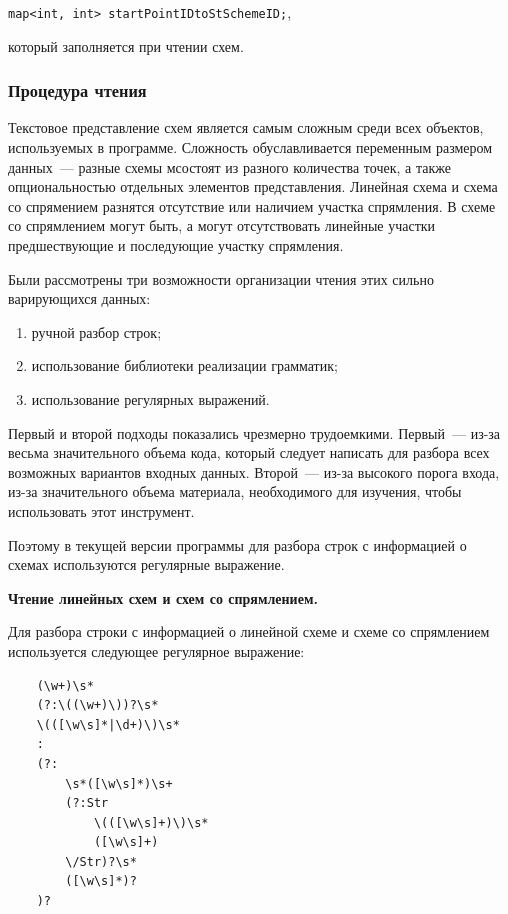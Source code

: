 \documentclass[12pt]{article}
\theoremstyle{plain}
\begin{document}
\centerline{\texttt{map<int, int> startPointIDtoStSchemeID;},}

\noindent
который заполняется при чтении схем.


\subsubsection{Процедура чтения}
\label{sec:ReadingSchemes}

Текстовое представление схем является самым сложным среди всех объектов, используемых в программе. Сложность обуславливается переменным размером данных~--- разные схемы мсостоят из разного количества точек, а также опциональностью отдельных элементов представления. Линейная схема и схема со спрямением разнятся отсутствие или наличием участка спрямления. В схеме со спрямлением могут быть, а могут отсутствовать линейные участки предшествующие и последующие участку спрямления. 

Были рассмотрены три возможности организации чтения этих сильно варирующихся данных:
\begin{enumerate}[topsep=-0.5\parsep,itemsep=-0.5\parsep]
  \item ручной разбор строк;
  \item использование библиотеки реализации грамматик;
  \item использование регулярных выражений.
\end{enumerate}

Первый и второй подходы показались чрезмерно трудоемкими. Первый~--- из-за весьма значительного объема кода, который следует написать для разбора всех возможных вариантов входных данных. Второй~--- из-за высокого порога входа, из-за значительного объема материала, необходимого для изучения, чтобы использовать этот инструмент.

Поэтому в текущей версии программы для разбора строк с информацией о схемах используются регулярные выражение.

\medskip

\noindent
\textbf{Чтение линейных схем и схем со спрямлением.}

Для разбора строки с информацией о линейной схеме и схеме со спрямлением используется следующее регулярное выражение:
\begin{verbatim}
    (\w+)\s*
    (?:\((\w+)\))?\s*
    \(([\w\s]*|\d+)\)\s*
    :
    (?:
        \s*([\w\s]*)\s+
        (?:Str
            \(([\w\s]+)\)\s*
            ([\w\s]+)
        \/Str)?\s*
        ([\w\s]*)?
    )?
\end{verbatim}
\end{document}

